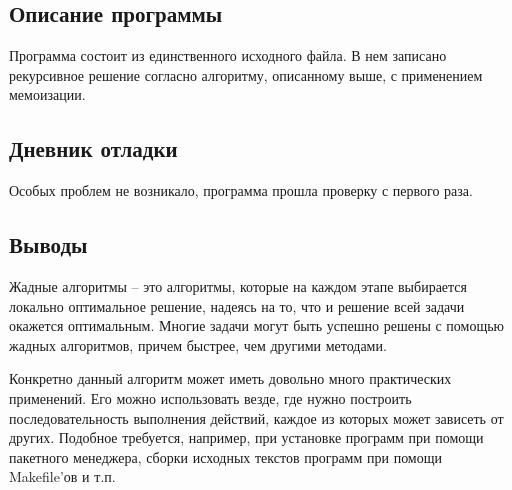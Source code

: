 \documentclass[12pt]{article}
\begin{document}
\subsection*{Описание программы}

Программа состоит из единственного исходного файла. В нем записано рекурсивное решение согласно алгоритму, описанному выше, с применением мемоизации.

\subsection*{Дневник отладки}

Особых проблем не возникало, программа прошла проверку с первого раза.

\subsection*{Выводы}

Жадные алгоритмы -- это алгоритмы, которые на каждом этапе выбирается локально оптимальное решение, надеясь на то, что и решение всей задачи окажется оптимальным. Многие задачи могут быть успешно решены с помощью жадных алгоритмов, причем быстрее, чем другими методами.

Конкретно данный алгоритм может иметь довольно много практических применений. Его можно использовать везде, где нужно построить последовательность выполнения действий, каждое из которых может зависеть от других. Подобное требуется, например, при установке программ при помощи пакетного менеджера, сборки исходных текстов программ при помощи Makefile'ов и т.п. 
\end{document}
